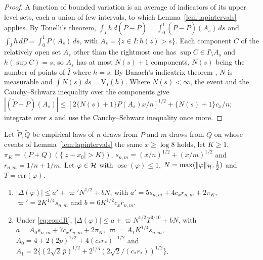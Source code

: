 \begin{proof}
A function of bounded variation is an average of indicators of its upper level sets, each a union of few intervals,
to which Lemma~\ref{lem:lapintervals} applies. By Tonelli's theorem, $\int_Ih\,d(\tilde P-P)=\int_0^1(\tilde P-P)(A_s)\,ds$ and $\int_Ih\,dP=\int_0^1P(A_s)\,ds$, with
$A_s=\{z\in I:h(z)>s\}$. Each component $C$ of the relatively open set $A_s$ other than the rightmost one has
$\sup C\in I\setminus A_s$ and $h(\sup C)=s$, so $A_s$ has at most $N(s)+1$ components, $N(s)$ being the number of
points of $\bar I$ where $h=s$. By Banach's indicatrix theorem \citep{banach1925lignes}, $N$ is measurable and
$\int N(s)\,ds=\mathrm V_I(h)$. Where $N(s)<\infty$, the event and the Cauchy--Schwarz inequality over the components give
$|(\tilde P-P)(A_s)|\le[2\{N(s)+1\}P(A_s)x/n]^{1/2}+\{N(s)+1\}c_x/n$; integrate over $s$ and use the Cauchy--Schwarz
inequality once more.
\end{proof}

\begin{lemma}
\label{lem:lapdev}
Let $\tilde P,\tilde Q$ be empirical laws of $n$ draws from $P$ and $m$ draws from $Q$ on whose events of
Lemma~\ref{lem:lapintervals} the same $x\ge\log8$ holds, let $K\ge1$, $\pi_K=(P+Q)(\{|z-x_0|>K\})$,
$s_{n,m}=(x/n)^{1/2}+(x/m)^{1/2}$ and $r_{n,m}=1/n+1/m$. Let $\varphi\in\mathcal{H}$ with $\operatorname{osc}(\varphi)\le1$,
$N=\max(\|\varphi\|_{\mathcal{H}},\tfrac12)$ and $T=\mathrm{err}(\varphi)$.
\begin{enumerate}[label=(\alph*),leftmargin=*]
\item $|\Delta(\varphi)|\le a'+\varpi'N^{1/2}+bN$, with $a'=5s_{n,m}+4c_xr_{n,m}+2\pi_K$, $\varpi'=2K^{1/4}s_{n,m}$
and $b=6K^{1/2}c_xr_{n,m}$.
\item Under \eqref{eq:condR}, $|\Delta(\varphi)|\le a+\varpi N^{1/2}T^{3/10}+bN$, with $a=A_0s_{n,m}+7c_xr_{n,m}+2\pi_K$,
$\varpi=A_1K^{1/4}s_{n,m}$, $A_0=4+2(2\bar p)^{1/2}+4(c_\ast r_\ast)^{-1/2}$ and
$A_1=2\{(2\sqrt2\,\bar p)^{1/2}+2^{1/5}(2\sqrt2/(c_\ast r_\ast))^{1/2}\}$.
\end{enumerate}
\end{lemma}


